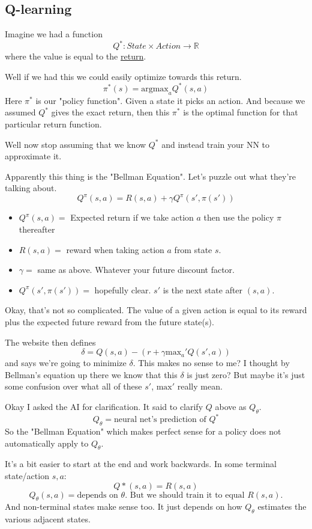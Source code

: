 \documentclass[11pt,notitlepage]{report}
\theoremstyle{definition}
\theoremstyle{plain}
\begin{document}
\subsection{Q-learning}

Imagine we had a function
\[Q^*: State \times Action \to \mathbb{R}\]
where the value is equal to the \hyperref[def:return]{return}.

Well if we had this we could easily optimize towards this return.
\[\pi^*(s) = \text{argmax}_{a}Q^*(s,a)\]
Here $\pi^*$ is our "policy function". Given a state it picks an action.
And because we assumed $Q^*$ gives the exact return, then this $\pi^*$ is the
optimal function for that particular return function.

Well now stop assuming that we know $Q^*$ and instead train your NN to approximate it.

Apparently this thing is the "Bellman Equation". Let's puzzle out what they're talking about.
\[Q^\pi(s,a) = R(s,a) + \gamma Q^\pi(s', \pi(s'))\]
\begin{itemize}
\item $Q^\pi(s,a) =$ Expected return if we take action $a$ then use the policy $\pi$ thereafter
\item $R(s,a) =$ reward when taking action $a$ from state $s$.
\item $\gamma =$ same as above. Whatever your future discount factor.
\item $Q^\pi(s', \pi(s')) =$ hopefully clear. $s'$ is the next state after $(s,a)$.
\end{itemize}
Okay, that's not so complicated. The value of a given action is equal to its reward plus the expected
future reward from the future state(s).

The website then defines
\[\delta = Q(s,a) - \left(r+\gamma \text{max}_a' Q(s',a)\right)\]
and says we're going to minimize $\delta$. This makes no sense to me? I thought by Bellman's
equation up there we know that this $\delta$ is just zero? But maybe it's just some confusion
over what all of these $s'$, $\text{max}'$ really mean.

Okay I asked the AI for clarification. It said to clarify $Q$ above as $Q_\theta$.
\[Q_\theta = \text{neural net's prediction of } Q^*\]
So the "Bellman Equation" which makes perfect sense for a policy does not automatically apply
to $Q_\theta$.

It's a bit easier to start at the end and work backwards. In some terminal state/action $s, a$:
\[Q*(s,a) = R(s,a)\]
\[Q_\theta(s,a) = \text{depends on }\theta.\text{ But we should train it to equal } R(s,a).\]
And non-terminal states make sense too. It just depends on how $Q_\theta$ estimates the
various adjacent states.
\end{document}
